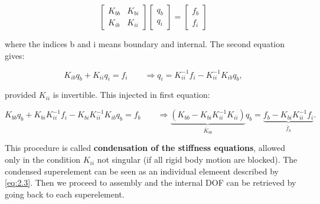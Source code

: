 	\begin{equation}
	\left[
	\begin{array}{cc}
	K_{bb} &K_{bi}\\
	K_{ib} & K_{ii}
	\end{array}
	\right]
		\left[
	\begin{array}{c}
	q_{b} \\
	q_{i} 
	\end{array}
	\right]
	=
	\left[
	\begin{array}{c}
	f_{b} \\
	f_{i} 
	\end{array}
	\right]
	\end{equation}
	
	where the indices b and i means boundary and internal. The second equation gives: 
	
	\begin{equation}
	K_{ib} q_b + K_{ii}q_i = f_i \qquad \Rightarrow q_i = K_{ii}^{-1} f_i - K_{ii}^{-1} K_{ib}q_b,
	\end{equation}
	
	provided $K_{ii}$ is invertible. This injected in first equation: 
	
	\begin{equation}
	K_{bb}q_b + K_{bi}K_{ii}^{-1} f_i - K_{bi}K_{ii}^{-1} K_{ib}q_b = f_b \qquad \Rightarrow \underbrace{(K_{bb} - K_{bi}K_{ii}^{-1}K_{ii})}_{\bar{K}_{bb}} q_b = \underbrace{f_b - K_{bi}K_{ii}^{-1}f_i}_{\bar{f}_b}.
	\label{eq:2.3}
	\end{equation}
	
	This procedure is called \textbf{condensation of the stiffness equations}, allowed only in the condition $K_{ii}$ not singular (if all rigid body motion are blocked). The condensed superelement can be seen as an individual elemeent described by \autoref{eq:2.3}. Then we proceed to assembly and the internal DOF can be retrieved by going back to each superelement.
